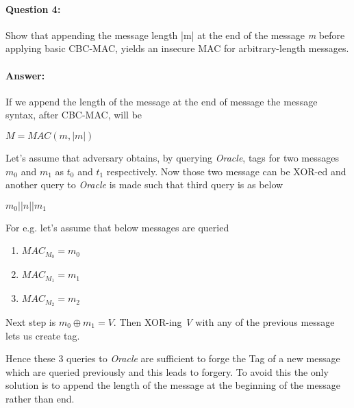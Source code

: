 \documentclass{article}
\begin{document}
    \paragraph{Question 4:} Show that appending the message length |m| at the end of the message \emph{m} before applying basic CBC-MAC, yields an insecure MAC for arbitrary-length messages.
    \paragraph{Answer: \newline}
    If we append the length of the message at the end of message the message syntax, after CBC-MAC, will be \newline
    \begin{center}
        $\mathit{M} = MAC(m,|m|)$
    \end{center}
    Let's assume that adversary obtains, by querying \emph{Oracle}, tags for two messages $\mathit{m_0}$ and $\mathit{m_1}$ as $\mathit{t_0}$ and $\mathit{t_1}$ respectively. Now those two message can be XOR-ed and another query to \emph{Oracle} is made such that third query is as below \newline
    \begin{center}
        $\mathit{m_0||n||m_1}$
    \end{center}
    For e.g. let's assume that below messages are queried \newline
    \begin{enumerate}
        \item $MAC_{M_0} = \mathit{m_0}$
        \item $MAC_{M_1} = \mathit{m_1}$
        \item $MAC_{M_2} = \mathit{m_2}$
    \end{enumerate}
    
    Next step is ${m_0} \oplus{m_1} = \mathit{V}$. Then XOR-ing \emph{V} with any of the previous message lets us create tag.
    
    Hence these 3 queries to \emph{Oracle} are sufficient to forge the Tag of a new message which are queried previously and this leads to forgery. \newline
    To avoid this the only solution is to append the length of the message at the beginning of the message rather than end.




\end{document}

